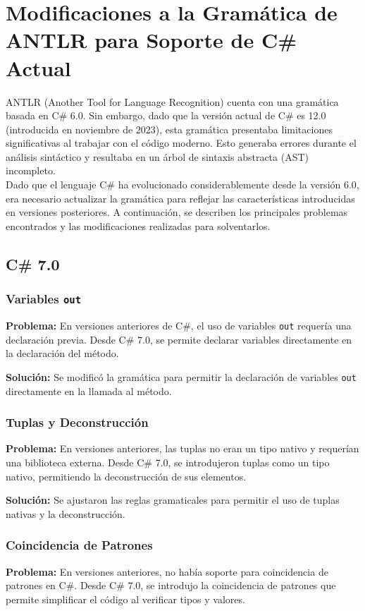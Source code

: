 \chapter{Modificaciones a la Gramática de ANTLR para Soporte de C\# Actual}\label{chapter:proposal}

ANTLR (Another Tool for Language Recognition) cuenta con una gramática basada en C\# 6.0. Sin embargo, dado que la versión actual de C\# es 12.0 (introducida en noviembre de 2023), esta gramática presentaba limitaciones significativas al trabajar con el código moderno. Esto generaba errores durante el análisis sintáctico y resultaba en un árbol de sintaxis abstracta (AST) incompleto. \\

Dado que el lenguaje C\# ha evolucionado considerablemente desde la versión 6.0, era necesario actualizar la gramática para reflejar las características introducidas en versiones posteriores. A continuación, se describen los principales problemas encontrados y las modificaciones realizadas para solventarlos.

\section{C\# 7.0}

\subsection{Variables \texttt{out}}
\textbf{Problema:} En versiones anteriores de C\#, el uso de variables \texttt{out} requería una declaración previa. Desde C\# 7.0, se permite declarar variables directamente en la declaración del método.

\textbf{Solución:} Se modificó la gramática para permitir la declaración de variables \texttt{out} directamente en la llamada al método.

\subsection{Tuplas y Deconstrucción}
\textbf{Problema:} En versiones anteriores, las tuplas no eran un tipo nativo y requerían una biblioteca externa. Desde C\# 7.0, se introdujeron tuplas como un tipo nativo, permitiendo la deconstrucción de sus elementos.

\textbf{Solución:} Se ajustaron las reglas gramaticales para permitir el uso de tuplas nativas y la deconstrucción.

\subsection{Coincidencia de Patrones}
\textbf{Problema:} En versiones anteriores, no había soporte para coincidencia de patrones en C\#. Desde C\# 7.0, se introdujo la coincidencia de patrones que permite simplificar el código al verificar tipos y valores.

